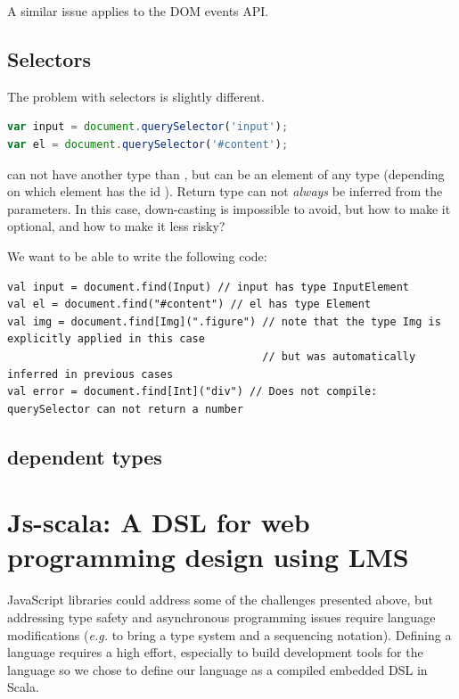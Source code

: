 \documentclass[runningheads,a4paper]{llncs}
\newcommand{\eg}{\emph{e.g.}}
\begin{document}
A similar issue applies to the DOM events API.

\subsection{Selectors}

The problem with selectors is slightly different.

\begin{lstlisting}[language=JavaScript]
var input = document.querySelector('input');
var el = document.querySelector('#content');
\end{lstlisting}

 can not have another type than , but  can be an element of
any type (depending on which element has the id ). Return type can not \emph{always}
be inferred from the parameters. In this case, down-casting is impossible to avoid, but how to make
it optional, and how to make it less risky?

We want to be able to write the following code:

\begin{lstlisting}
val input = document.find(Input) // input has type InputElement
val el = document.find("#content") // el has type Element
val img = document.find[Img](".figure") // note that the type Img is explicitly applied in this case
                                        // but was automatically inferred in previous cases
val error = document.find[Int]("div") // Does not compile: querySelector can not return a number
\end{lstlisting}



\subsection{dependent types}

\section{Js-scala: A DSL for web programming design using LMS}


JavaScript libraries could address some of the challenges presented above, but addressing type safety and
asynchronous programming issues require language modifications (\eg{} to bring a type system and a sequencing
notation). Defining a language requires a high effort, especially to build development tools for the language so we
chose to define our language as a compiled embedded DSL in Scala.
\end{document}
